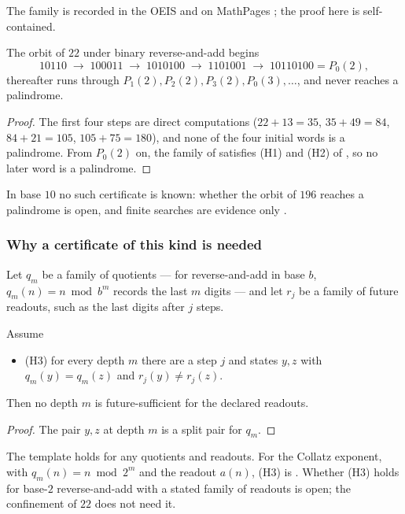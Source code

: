 The family is recorded in the OEIS and on MathPages \citep{OEIS-A060382,Brown-MathPages}; the proof
here is self-contained.

\begin{corollary}\label{cor:orbit-22}
The orbit of $22$ under binary reverse-and-add begins
\[
  10110 \;\to\; 100011 \;\to\; 1010100 \;\to\; 1101001 \;\to\; 10110100 = P_0(2),
\]
thereafter runs through $P_1(2), P_2(2), P_3(2), P_0(3), \ldots$, and never reaches a palindrome.
\end{corollary}

\begin{proof}
The first four steps are direct computations ($22 + 13 = 35$, $35 + 49 = 84$, $84 + 21 = 105$,
$105 + 75 = 180$), and none of the four initial words is a palindrome. From $P_0(2)$ on, the family
of  satisfies (H1) and (H2) of , so no later word is a
palindrome.
\end{proof}

In base $10$ no such certificate is known: whether the orbit of $196$ reaches a palindrome is
open, and finite searches are evidence only \citep{Walker-Fourmilab}.

\subsubsection*{Why a certificate of this kind is needed}

Let $q_m$ be a family of quotients --- for reverse-and-add in base $b$, $q_m(n) = n \bmod b^m$
records the last $m$ digits --- and let $r_j$ be a family of future readouts, such as the last
digits after $j$ steps.

\begin{schema}\label{thm:G5-nogo}
Assume
\begin{itemize}
  \item \textup{(H3)} for every depth $m$ there are a step $j$ and states $y, z$ with
    $q_m(y) = q_m(z)$ and $r_j(y) \ne r_j(z)$.
\end{itemize}
Then no depth $m$ is future-sufficient for the declared readouts.
\end{schema}

\begin{proof}
The pair $y, z$ at depth $m$ is a split pair for $q_m$.
\end{proof}

The template holds for any quotients and readouts. For the Collatz exponent, with
$q_m(n) = n \bmod 2^m$ and the readout $a(n)$, (H3) is . Whether (H3) holds
for base-$2$ reverse-and-add with a stated family of readouts is open; the confinement of $22$ does
not need it.

